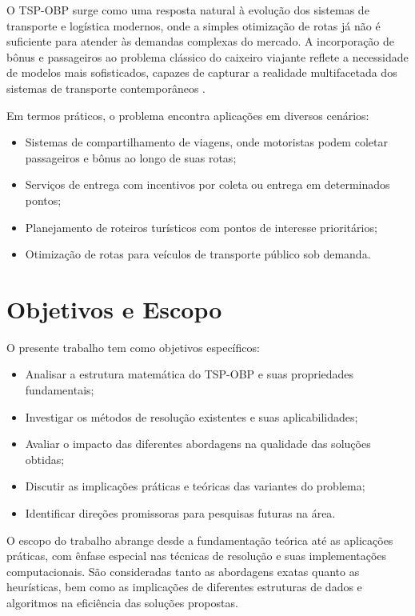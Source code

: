 \documentclass[12pt, a4paper]{report}
\begin{document}
O TSP-OBP surge como uma resposta natural à evolução dos sistemas de transporte e logística modernos, onde a simples otimização de rotas já não é suficiente para atender às demandas complexas do mercado. A incorporação de bônus e passageiros ao problema clássico do caixeiro viajante reflete a necessidade de modelos mais sofisticados, capazes de capturar a realidade multifacetada dos sistemas de transporte contemporâneos \cite{machado}.

Em termos práticos, o problema encontra aplicações em diversos cenários:
\begin{itemize}
    \item Sistemas de compartilhamento de viagens, onde motoristas podem coletar passageiros e bônus ao longo de suas rotas;
    \item Serviços de entrega com incentivos por coleta ou entrega em determinados pontos;
    \item Planejamento de roteiros turísticos com pontos de interesse prioritários;
    \item Otimização de rotas para veículos de transporte público sob demanda.
\end{itemize}

\section{Objetivos e Escopo}

O presente trabalho tem como objetivos específicos:
\begin{itemize}
    \item Analisar a estrutura matemática do TSP-OBP e suas propriedades fundamentais;
    \item Investigar os métodos de resolução existentes e suas aplicabilidades;
    \item Avaliar o impacto das diferentes abordagens na qualidade das soluções obtidas;
    \item Discutir as implicações práticas e teóricas das variantes do problema;
    \item Identificar direções promissoras para pesquisas futuras na área.
\end{itemize}

O escopo do trabalho abrange desde a fundamentação teórica até as aplicações práticas, com ênfase especial nas técnicas de resolução e suas implementações computacionais. São consideradas tanto as abordagens exatas quanto as heurísticas, bem como as implicações de diferentes estruturas de dados e algoritmos na eficiência das soluções propostas.
\end{document}
